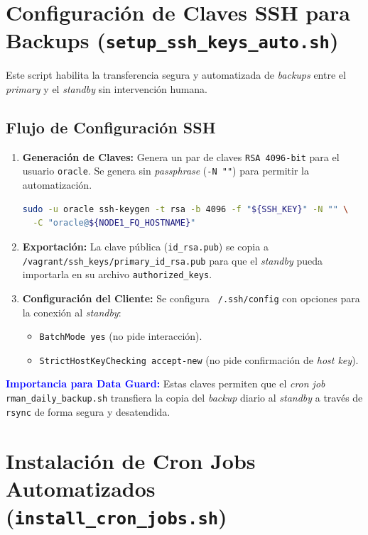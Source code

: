 \documentclass[11pt, a4paper]{report}
\newcommand{\destacado}[1]{\textbf{\textcolor{blue}{#1}}}
\begin{document}
\section{Configuración de Claves SSH para Backups (\texttt{setup\_ssh\_keys\_auto.sh})}

Este script habilita la transferencia segura y automatizada de \textit{backups} entre el \textit{primary} y el \textit{standby} sin intervención humana.
\subsection{Flujo de Configuración SSH}
\begin{enumerate}
    \item \textbf{Generación de Claves:} Genera un par de claves \texttt{RSA 4096-bit} para el usuario \texttt{oracle}.
Se genera sin \textit{passphrase} (\texttt{-N ""}) para permitir la automatización.
\begin{lstlisting}[language=bash, caption={Generación de Claves RSA}]
sudo -u oracle ssh-keygen -t rsa -b 4096 -f "${SSH_KEY}" -N "" \
  -C "oracle@${NODE1_FQ_HOSTNAME}"
        \end{lstlisting}
    \item \textbf{Exportación:} La clave pública (\texttt{id\_rsa.pub}) se copia a \texttt{/vagrant/ssh\_keys/primary\_id\_rsa.pub} para que el \textit{standby} pueda importarla en su archivo \texttt{authorized\_keys}.
\item \textbf{Configuración del Cliente:} Se configura \texttt{~/.ssh/config} con opciones para la conexión al \textit{standby}:
        \begin{itemize}
            \item \texttt{BatchMode yes} (no pide interacción).
\item \texttt{StrictHostKeyChecking accept-new} (no pide confirmación de \textit{host key}).
        \end{itemize}
\end{enumerate}
\destacado{Importancia para Data Guard:} Estas claves permiten que el \textit{cron job} \texttt{rman\_daily\_backup.sh} transfiera la copia del \textit{backup} diario al \textit{standby} a través de \texttt{rsync} de forma segura y desatendida.
\section{Instalación de Cron Jobs Automatizados (\texttt{install\_cron\_jobs.sh})}
\end{document}
